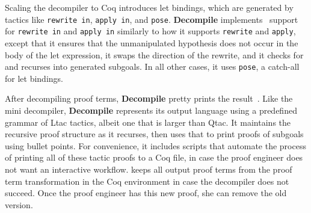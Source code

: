 Scaling the decompiler to Coq introduces let bindings, which are generated by 
tactics like \lstinline{rewrite in}, \lstinline{apply in}, and \lstinline{pose}.
\textbf{Decompile} implements~ %
support for \lstinline{rewrite in} and \lstinline{apply in} similarly to how it supports
\lstinline{rewrite} and \lstinline{apply}, except that it ensures that the unmanipulated hypothesis does not occur in the body of the let expression,
it swaps the direction of the rewrite, and it checks for and recurses into generated subgoals.
In all other cases, it uses \lstinline{pose}, a catch-all for let bindings.

After decompiling proof terms, \textbf{Decompile} pretty prints the result~.
Like the mini decompiler, \textbf{Decompile} represents its output language using a predefined grammar of Ltac tactics,
albeit one that is larger than Qtac.
It maintains the recursive proof structure as it recurses, then uses that to print proofs of subgoals using bullet points.
For convenience, it includes scripts that automate the process of printing all of these tactic proofs to a Coq file,
in case the proof engineer does not want an interactive workflow.
\toolname keeps all output proof terms from the proof term transformation in the Coq environment in case the decompiler does not succeed.
Once the proof engineer has this new proof, she can remove the old version.



